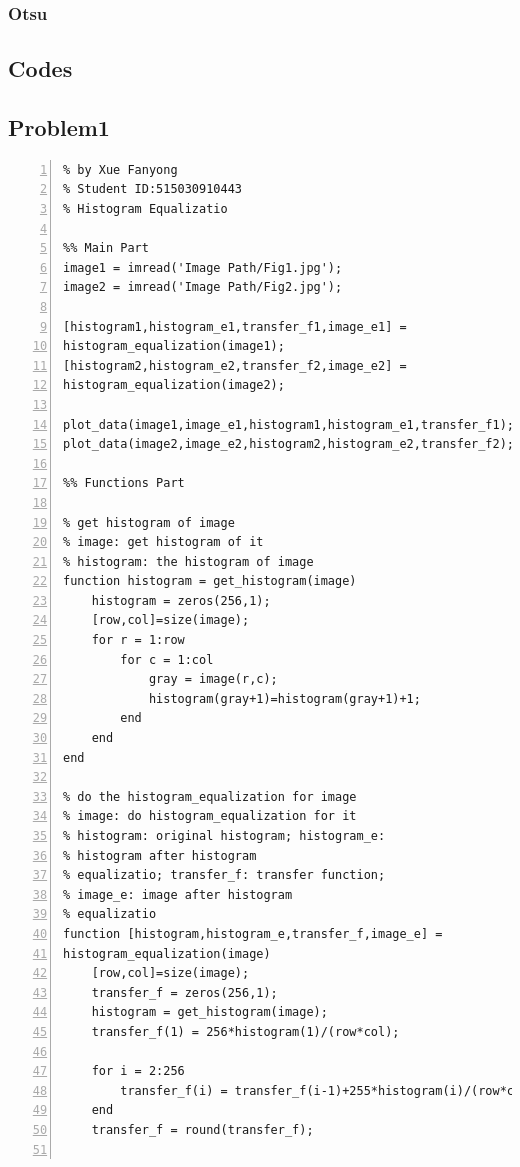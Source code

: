\documentclass[11pt,oneside]{book}
\begin{document}
\subsection{Otsu}




\begin{appendices}
\chapter{Codes}
\section{Problem1}

\begin{lstlisting}[numbers=left, numberstyle=\tiny,keywordstyle=\color{blue!70},commentstyle=\color{red!50!green!50!blue!50},frame=shadowbox, rulesepcolor=\color{red!20!green!20!blue!20}] 
% Problem 1
% by Xue Fanyong
% Student ID:515030910443
% Histogram Equalizatio

%% Main Part
image1 = imread('Image Path/Fig1.jpg');
image2 = imread('Image Path/Fig2.jpg');

[histogram1,histogram_e1,transfer_f1,image_e1] = 
histogram_equalization(image1);
[histogram2,histogram_e2,transfer_f2,image_e2] = 
histogram_equalization(image2);

plot_data(image1,image_e1,histogram1,histogram_e1,transfer_f1);
plot_data(image2,image_e2,histogram2,histogram_e2,transfer_f2);

%% Functions Part

% get histogram of image
% image: get histogram of it
% histogram: the histogram of image
function histogram = get_histogram(image)
    histogram = zeros(256,1);
    [row,col]=size(image);
    for r = 1:row
        for c = 1:col
            gray = image(r,c);
            histogram(gray+1)=histogram(gray+1)+1;
        end
    end
end

% do the histogram_equalization for image
% image: do histogram_equalization for it
% histogram: original histogram; histogram_e: 
% histogram after histogram
% equalizatio; transfer_f: transfer function; 
% image_e: image after histogram
% equalizatio
function [histogram,histogram_e,transfer_f,image_e] = 
histogram_equalization(image)
    [row,col]=size(image);
    transfer_f = zeros(256,1);
    histogram = get_histogram(image);
    transfer_f(1) = 256*histogram(1)/(row*col);
    
    for i = 2:256
        transfer_f(i) = transfer_f(i-1)+255*histogram(i)/(row*col);
    end
    transfer_f = round(transfer_f);
    

\end{lstlisting}
\end{appendices}
\end{document}
